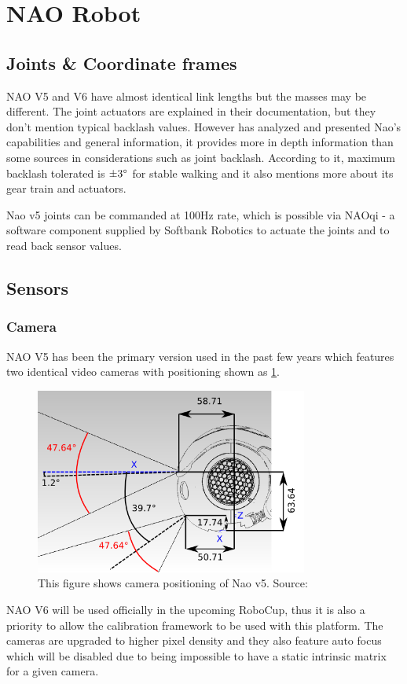 \documentclass[english, printversion, nomenclature, notitle]{tuvisionthesis} %
\makeatletter
\renewcommand{\todo}[2][]{\tikzexternaldisable\@todo[#1]{#2}\tikzexternalenable}
\makeatother
\begin{document}
\section{NAO Robot}


\todo{is it the right place?}
\subsection{Joints \& Coordinate frames}

NAO V5 and V6 have almost identical link lengths but the masses may be different. The joint actuators are explained in their documentation, but they don't mention typical backlash values. However \cite{gouaillier_nao_2008} has analyzed and presented Nao's capabilities and general information, it provides more in depth information than some sources in considerations such as joint backlash. According to it, maximum backlash tolerated is $\pm 3\degree$ for stable walking and it also mentions more about its gear train and actuators.

Nao v5 joints can be commanded at 100Hz rate, which is possible via NAOqi - a software component supplied by Softbank Robotics to actuate the joints and to read back sensor values.

\subsection{Sensors}
\subsubsection{Camera}
NAO V5 has been the primary version used in the past few years which features two identical video cameras with positioning shown as \cref{fig:naov5_cameras}.

\begin{figure}
	\begin{center}
		\includegraphics[width=0.8\textwidth]{nao_hardware_camera_lateral.png}
		\caption[Nao v5 camera positioning]{This figure shows camera positioning of Nao v5. Source: \cite{softbank_robotics_video_nodate}}
		\label{fig:naov5_cameras}
	\end{center}
\end{figure}
NAO V6 will be used officially in the upcoming RoboCup, thus it is also a priority to allow the calibration framework to be used with this platform. The cameras are upgraded to higher pixel density and they also feature auto focus which will be disabled due to being impossible to have a static intrinsic matrix for a given camera.
\end{document}
